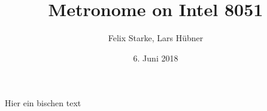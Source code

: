 \documentclass[a4paper, 10pt]{scrartcl}
\title{Metronome on Intel 8051}
\author{Felix Starke, Lars Hübner}
\date{6. Juni 2018}
\begin{document}
Hier ein bischen text
\end{document}
